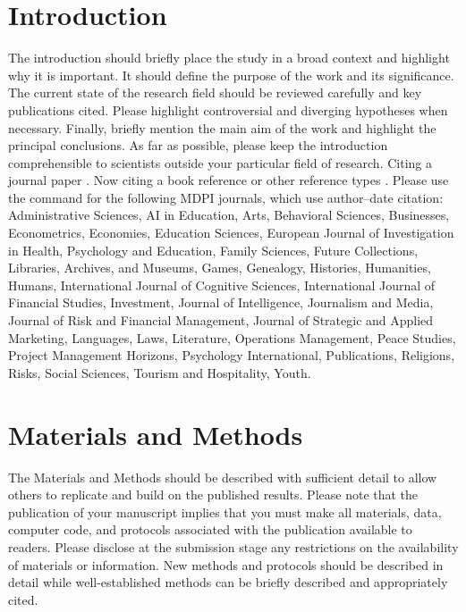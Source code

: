 \documentclass[journal,article,submit,moreauthors]{Definitions/mdpi}
\begin{document}


\section{Introduction}

The introduction should briefly place the study in a broad context and highlight why it is important. It should define the purpose of the work and its significance. The current state of the research field should be reviewed carefully and key publications cited. Please highlight controversial and diverging hypotheses when necessary. Finally, briefly mention the main aim of the work and highlight the principal conclusions. As far as possible, please keep the introduction comprehensible to scientists outside your particular field of research. Citing a journal paper \citep{ref-journal}.  Now citing a book reference \citep{ref-book1,ref-book2} or other reference types \citep{ref-unpublish,ref-url}. Please use the command \citep{ref-proceeding,ref-thesis} for the following MDPI journals, which use author--date citation: Administrative Sciences, AI in Education, Arts, Behavioral Sciences, Businesses, Econometrics, Economies, Education Sciences, European Journal of Investigation in Health, Psychology and Education, Family Sciences, Future Collections, Libraries, Archives, and Museums, Games, Genealogy, Histories, Humanities, Humans, International Journal of Cognitive Sciences, International Journal of Financial Studies, Investment, Journal of Intelligence, Journalism and Media, Journal of Risk and Financial Management, Journal of Strategic and Applied Marketing, Languages, Laws, Literature, Operations Management, Peace Studies, Project Management Horizons, Psychology International, Publications, Religions, Risks, Social Sciences, Tourism and Hospitality, Youth. 

\section{Materials and Methods}

The Materials and Methods should be described with sufficient detail to allow others to replicate and build on the published results. Please note that the publication of your manuscript implies that you must make all materials, data, computer code, and protocols associated with the publication available to readers. Please disclose at the submission stage any restrictions on the availability of materials or information. New methods and protocols should be described in detail while well-established methods can be briefly described and appropriately cited.
\end{document}
